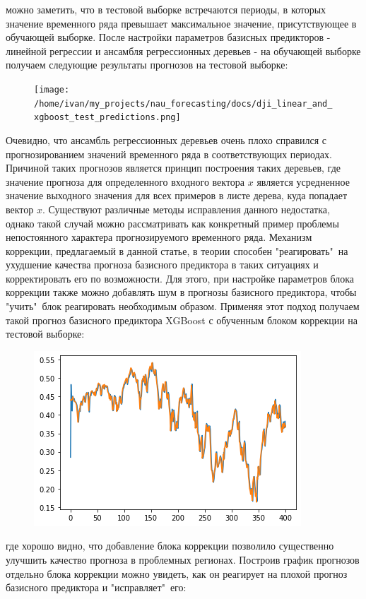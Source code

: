 \documentclass[11pt]{article}
\begin{document}
можно заметить, что в тестовой выборке встречаются периоды, в которых значение временного ряда превышает максимальное значение, присутствующее в обучающей выборке. После настройки параметров базисных предикторов - линейной регрессии и ансамбля регрессионных деревьев - на обучающей выборке получаем следующие результаты прогнозов на тестовой выборке:
\begin{figure}[H]
\centering
\texttt{[image: /home/ivan/my\_projects/nau\_forecasting/docs/dji\_linear\_and\_xgboost\_test\_predictions.png]}
\label{}
\end{figure}
Очевидно, что ансамбль регрессионных деревьев очень плохо справился с прогнозированием значений временного ряда в соответствующих периодах. Причиной таких прогнозов является принцип построения таких деревьев, где значение прогноза для определенного входного вектора $x$ является усредненное значение выходного значения для всех примеров в листе дерева, куда попадает вектор $x$. Существуют различные методы исправления данного недостатка, однако такой случай можно рассматривать как конкретный пример проблемы непостоянного характера прогнозируемого временного ряда. Механизм коррекции, предлагаемый в данной статье, в теории способен "реагировать"\ на ухудшение качества прогноза базисного предиктора в таких ситуациях и корректировать его по возможности. Для этого, при настройке параметров блока коррекции также можно добавлять шум в прогнозы базисного предиктора, чтобы "учить"\ блок реагировать необходимым образом. Применяя этот подход получаем такой прогноз базисного предиктора XGBoost с обученным блоком коррекции на тестовой выборке:
\begin{figure}[H]
\centering
\includegraphics[scale=0.5]{dji_test_xgboost_plus_correction.png}
\label{}
\end{figure}
где хорошо видно, что добавление блока коррекции позволило существенно улучшить качество прогноза в проблемных регионах. Построив график прогнозов отдельно блока коррекции можно увидеть, как он реагирует на плохой прогноз базисного предиктора и "исправляет"\ его:
\end{document}
